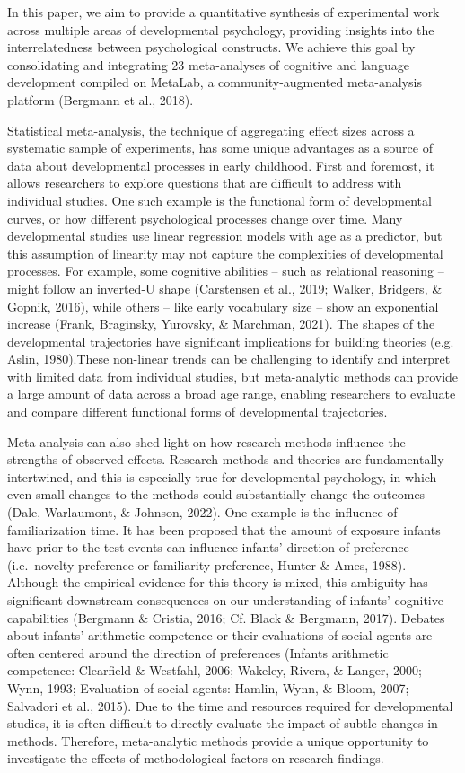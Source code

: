 \documentclass[10pt, letterpaper]{article}
\begin{document}
In this paper, we aim to provide a quantitative synthesis of
experimental work across multiple areas of developmental psychology,
providing insights into the interrelatedness between psychological
constructs. We achieve this goal by consolidating and integrating 23
meta-analyses of cognitive and language development compiled on MetaLab,
a community-augmented meta-analysis platform (Bergmann et al., 2018).

Statistical meta-analysis, the technique of aggregating effect sizes
across a systematic sample of experiments, has some unique advantages as
a source of data about developmental processes in early childhood. First
and foremost, it allows researchers to explore questions that are
difficult to address with individual studies. One such example is the
functional form of developmental curves, or how different psychological
processes change over time. Many developmental studies use linear
regression models with age as a predictor, but this assumption of
linearity may not capture the complexities of developmental processes.
For example, some cognitive abilities -- such as relational reasoning --
might follow an inverted-U shape (Carstensen et al., 2019; Walker,
Bridgers, \& Gopnik, 2016), while others -- like early vocabulary size
-- show an exponential increase (Frank, Braginsky, Yurovsky, \&
Marchman, 2021). The shapes of the developmental trajectories have
significant implications for building theories (e.g. Aslin, 1980).These
non-linear trends can be challenging to identify and interpret with
limited data from individual studies, but meta-analytic methods can
provide a large amount of data across a broad age range, enabling
researchers to evaluate and compare different functional forms of
developmental trajectories.

Meta-analysis can also shed light on how research methods influence the
strengths of observed effects. Research methods and theories are
fundamentally intertwined, and this is especially true for developmental
psychology, in which even small changes to the methods could
substantially change the outcomes (Dale, Warlaumont, \& Johnson, 2022).
One example is the influence of familiarization time. It has been
proposed that the amount of exposure infants have prior to the test
events can influence infants' direction of preference (i.e.~novelty
preference or familiarity preference, Hunter \& Ames, 1988). Although
the empirical evidence for this theory is mixed, this ambiguity has
significant downstream consequences on our understanding of infants'
cognitive capabilities (Bergmann \& Cristia, 2016; Cf. Black \&
Bergmann, 2017). Debates about infants' arithmetic competence or their
evaluations of social agents are often centered around the direction of
preferences (Infants arithmetic competence: Clearfield \& Westfahl,
2006; Wakeley, Rivera, \& Langer, 2000; Wynn, 1993; Evaluation of social
agents: Hamlin, Wynn, \& Bloom, 2007; Salvadori et al., 2015). Due to
the time and resources required for developmental studies, it is often
difficult to directly evaluate the impact of subtle changes in methods.
Therefore, meta-analytic methods provide a unique opportunity to
investigate the effects of methodological factors on research findings.
\end{document}
